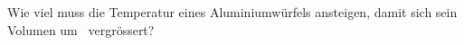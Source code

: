 Wie viel muss die Temperatur eines Aluminiumwürfels ansteigen, damit sich sein Volumen um \pVO\ vergrössert?
